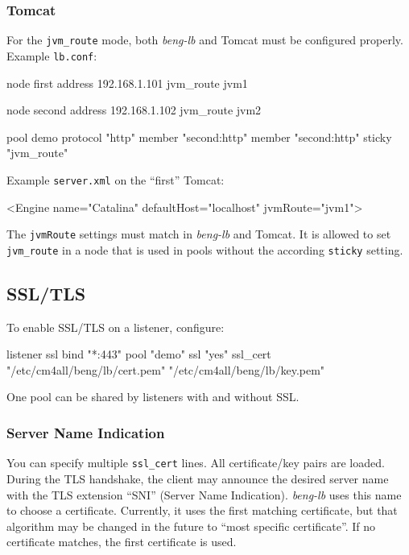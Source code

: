 \documentclass[a4paper,12pt]{article}
\begin{document}
\subsubsection{Tomcat}

For the \verb|jvm_route| mode, both \emph{beng-lb} and Tomcat must be
configured properly.  Example \texttt{lb.conf}:

\begin{verbatim*}
node first {
   address 192.168.1.101
   jvm_route jvm1
}

node second {
   address 192.168.1.102
   jvm_route jvm2
}

pool demo {
  protocol "http"
  member "second:http"
  member "second:http"
  sticky "jvm_route"
}
\end{verbatim*}

Example \texttt{server.xml} on the ``first'' Tomcat:

\begin{verbatim*}
<Engine name="Catalina" defaultHost="localhost" jvmRoute="jvm1">
\end{verbatim*}

The \verb|jvmRoute| settings must match in \emph{beng-lb} and Tomcat.
It is allowed to set \verb|jvm_route| in a node that is used in pools
without the according \verb|sticky| setting.

\subsection{SSL/TLS}
\label{ssl}

To enable SSL/TLS on a listener, configure:

\begin{verbatim*}
listener ssl {
  bind "*:443"
  pool "demo"
  ssl "yes"
  ssl_cert "/etc/cm4all/beng/lb/cert.pem" "/etc/cm4all/beng/lb/key.pem"
}
\end{verbatim*}

One pool can be shared by listeners with and without SSL.

\subsubsection{Server Name Indication}

You can specify multiple \verb|ssl_cert| lines.  All certificate/key
pairs are loaded.  During the TLS handshake, the client may announce
the desired server name with the TLS extension ``SNI'' (Server Name
Indication).  \emph{beng-lb} uses this name to choose a certificate.
Currently, it uses the first matching certificate, but that algorithm
may be changed in the future to ``most specific certificate''.  If no
certificate matches, the first certificate is used.
\end{document}
